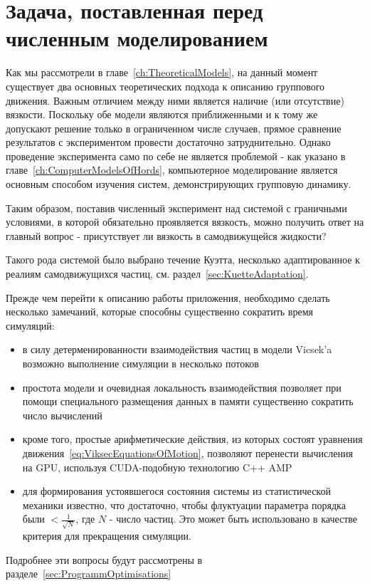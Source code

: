 \section{Задача, поставленная перед численным моделированием} %
\label{sec:MotivationForProgramm}
    Как мы рассмотрели в главе~\ref{ch:TheoreticalModels}, на данный момент существует два основных теоретических подхода к описанию группового движения. Важным отличием между ними является наличие (или отсутствие) вязкости. Поскольку обе модели являются приближенными и к тому же допускают решение только в ограниченном числе случаев, прямое сравнение результатов с экспериментом провести достаточно затруднительно. Однако проведение эксперимента само по себе не является проблемой - как указано в главе~\ref{ch:ComputerModelsOfHords}, компьютерное моделирование является основным способом изучения систем, демонстрирующих групповую динамику.

    Таким образом, поставив численный эксперимент над системой с граничными условиями, в которой обязательно проявляется вязкость, можно получить ответ на главный вопрос - присутствует ли вязкость в самодвижущейся жидкости?

    Такого рода системой было выбрано течение Куэтта, несколько адаптированное к реалиям самодвижущихся частиц, см. раздел~\ref{sec:KuetteAdaptation}.

    Прежде чем перейти к описанию работы приложения, необходимо сделать несколько замечаний, которые способны существенно сократить время симуляций:

    \begin{itemize}
        \item в силу детерменированности взаимодействия частиц в модели Vicsek'a возможно выполнение симуляции в несколько потоков
        \item простота модели и очевидная локальность взаимодействия позволяет при помощи специального размещения данных в памяти существенно сократить число вычислений
        \item кроме того, простые арифметические действия, из которых состоят уравнения движения~\ref{eq:ViksecEquationsOfMotion}, позволяют перенести вычисления на GPU, используя CUDA-подобную технологию C++ AMP
        \item для формирования устоявшегося состояния системы из статистической механики известно, что достаточно, чтобы флуктуации параметра порядка были $< \frac {1}{\sqrt{N}}$, где $N$ - число частиц. Это может быть использовано в качестве критерия для прекращения симуляции.
        \end{itemize}

    Подробнее эти вопросы будут рассмотрены в разделе~\ref{sec:ProgrammOptimisations}

